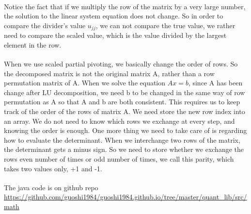 \documentclass[a4paper]{article}
\begin{document}
\\
Notice the fact that if we multiply the row of the matrix by a very large number, the solution to the linear system equation does not change. So in order to compare the divider's value $u_{jj}$, we can not compare the true value, we rather need to compare the scaled value, which is the value divided by the largest element in the row.\\

\\
When we use scaled partial pivoting, we basically change the order of rows. So the decomposed matrix is not the original matrix A, rather than a row permutation matrix of A. When we solve the equation $Ax=b$, since A has been change after LU decomposition, we need b to be changed in the same way of row permutation as A so that A and b are both consistent. This requires us to keep track of the order of the rows of matrix A. We need store the new row index into an array. We do not need to know which rows we exchange at every step, and knowing the order is enough. One more thing we need to take care of is regarding how to evaluate the determinant. When we interchange two rows of the matrix, the determinant gets a minus sign. So we need to store whether we exchange the rows even number of times or odd number of times, we call this parity, which takes two values only, +1 and -1.\\

\\
The java code is on github repo\\ 
\url{https://github.com/guoshi1984/guoshi1984.github.io/tree/master/quant\_lib/src/math}
\end{document}

